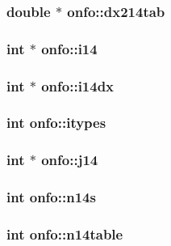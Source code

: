 \subsubsection{\setlength{\rightskip}{0pt plus 5cm}double $\ast$ {\bf onfo::dx214tab}}\label{structonfo_3daa47d83baffe2d19d106a38bbb6111}


\subsubsection{\setlength{\rightskip}{0pt plus 5cm}int $\ast$ {\bf onfo::i14}}\label{structonfo_3558d2874af3fc1f702c4c0fcf4c834f}


\subsubsection{\setlength{\rightskip}{0pt plus 5cm}int $\ast$ {\bf onfo::i14dx}}\label{structonfo_7e9c1682ccd4d1f83339bc47a2ddddab}


\subsubsection{\setlength{\rightskip}{0pt plus 5cm}int {\bf onfo::itypes}}\label{structonfo_65120523afc48740e76ff464640e073b}


\subsubsection{\setlength{\rightskip}{0pt plus 5cm}int $\ast$ {\bf onfo::j14}}\label{structonfo_80a7a1989a66c74cf849c92027a90c28}


\subsubsection{\setlength{\rightskip}{0pt plus 5cm}int {\bf onfo::n14s}}\label{structonfo_bc7b09f2d34461b7d49ac4bb1fcf7603}


\subsubsection{\setlength{\rightskip}{0pt plus 5cm}int {\bf onfo::n14table}}\label{structonfo_60433dc6bda4c0a5b7906668f5d97809}


